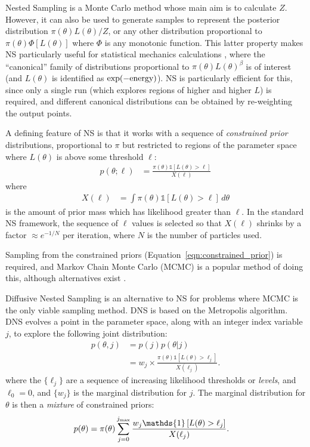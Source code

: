 \documentclass[article]{jss}
\begin{document}
Nested Sampling \citep[NS;][]{skilling} is a Monte Carlo method whose main
aim is to calculate $Z$. However, it can also be used to generate samples
to represent the posterior distribution $\pi(\theta)L(\theta)/Z$, or
any other distribution proportional to
$\pi(\theta)\Phi\left[L(\theta)\right]$ where $\Phi$ is any monotonic function.
This latter property makes NS particularly useful for statistical mechanics
calculations \citep{2009arXiv0906.3544P, 2015arXiv150303404B}, where the
``canonical'' family of distributions proportional to
$\pi(\theta)L(\theta)^\beta$ is of interest (and $L(\theta)$ is identified as
$\exp(-\textnormal{energy})$). NS is particularly efficient for this, since
only a single run (which explores regions of higher and higher $L$)
is required, and different canonical
distributions can be obtained by re-weighting the output points.

A defining feature of NS is that it works with a sequence of
{\em constrained prior} distributions, proportional to $\pi$ but
restricted to regions of the parameter space where $L(\theta)$
is above some threshold $\ell$:
\begin{align}
p(\theta; \ell) &=
\frac{\pi(\theta)\mathds{1}\left[L(\theta) > \ell\right]}{X(\ell)}
\label{eqn:constrained_prior}
\end{align}
where
\begin{align}
X(\ell) &= \int \pi(\theta) \mathds{1}\left[L(\theta) > \ell\right] \, d\theta
\end{align}
is the amount of prior mass which has likelihood greater than $\ell$.
In the standard NS framework, the sequence of $\ell$ values is selected
so that $X(\ell)$ shrinks by a factor $\approx e^{-1/N}$ per iteration, where
$N$ is the number of particles used.

Sampling from the constrained priors (Equation~\ref{eqn:constrained_prior})
is required, and Markov Chain Monte Carlo (MCMC) is a popular method of doing
this, although alternatives exist \citep[e.g.][]{multinest, handley}.

Diffusive Nested Sampling \citep[DNS][]{dnest} is an alternative to NS for
problems where MCMC is the only viable sampling method. DNS is based on the
Metropolis algorithm. DNS evolves a point in the parameter space, along with
an integer index variable $j$,
to explore the following joint distribution:
\begin{align}
p(\theta, j) &= p(j)p(\theta | j)\\
&= w_j \times
\frac{\pi(\theta)\mathds{1}\left[L(\theta) > \ell_j\right]}{X(\ell_j)}.
\label{eqn:target_distribution}
\end{align}
where the $\{\ell_j\}$ are a sequence of increasing likelihood thresholds
or {\em levels}, and
$\ell_0 = 0$, and $\{w_j\}$ is the marginal distribution for $j$.
The marginal distribution for $\theta$ is then a {\em mixture} of
constrained priors:
\begin{align}
p(\theta) &=
\pi(\theta)\sum_{j=0}^{j_{\rm max}}
\frac{w_j\mathds{1}\left[L(\theta) > \ell_j\right]}{X(\ell_j)}.
\label{eqn:mixture_of_constrained_priors}
\end{align}
\end{document}
